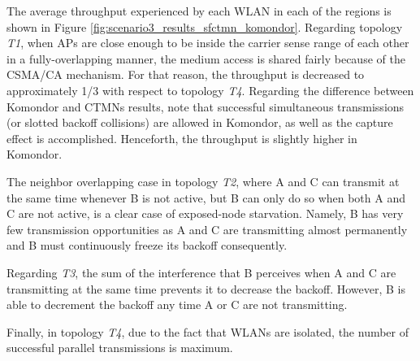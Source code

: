 \documentclass[a4paper]{article}
\begin{document}
	The average throughput experienced by each WLAN in each of the regions is shown in Figure \ref{fig:scenario3_results_sfctmn_komondor}. Regarding topology \textit{T1}, when APs are close enough to be inside the carrier sense range of each other in a fully-overlapping manner, the medium access is shared fairly because of the CSMA/CA mechanism. For that reason, the throughput is decreased to approximately 1/3 with respect to topology \textit{T4}. Regarding the difference between Komondor and CTMNs results, note that successful simultaneous transmissions (or slotted backoff collisions) are allowed in Komondor, as well as the capture effect is accomplished. Henceforth, the throughput is slightly higher in Komondor.
	
	The neighbor overlapping case in topology \textit{T2}, where A and C can transmit at the same time whenever B is not active, but B can only do so when both A and C are not active, is a clear case of exposed-node starvation. Namely, B has very few transmission opportunities as A and C are transmitting almost permanently and B must continuously freeze its backoff consequently. 
	
	Regarding \textit{T3}, the sum of the interference that B perceives when A and C are transmitting at the same time prevents it to decrease the backoff. However, B is able to decrement the backoff any time A or C are not transmitting.
	
	Finally, in topology \textit{T4}, due to the fact that WLANs are isolated, the number of successful parallel transmissions is maximum.
	
\end{document}
